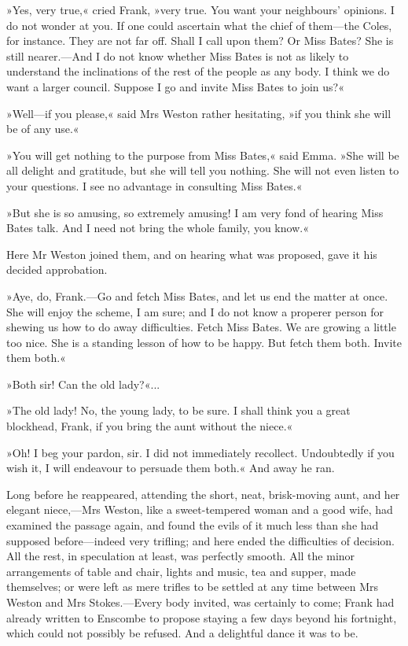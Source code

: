 »Yes, very true,« cried Frank, »very true. You want your neighbours' opinions. I do not wonder at you. If one could ascertain what the chief of them—the Coles, for instance. They are not far off. Shall I call upon them? Or Miss Bates? She is still nearer.—And I do not know whether Miss Bates is not as likely to understand the inclinations of the rest of the people as any body. I think we do want a larger council. Suppose I go and invite Miss Bates to join us?«

»Well—if you please,« said Mrs Weston rather hesitating, »if you think she will be of any use.«

»You will get nothing to the purpose from Miss Bates,« said Emma. »She will be all delight and gratitude, but she will tell you nothing. She will not even listen to your questions. I see no advantage in consulting Miss Bates.«

»But she is so amusing, so extremely amusing! I am very fond of hearing Miss Bates talk. And I need not bring the whole family, you know.«

Here Mr Weston joined them, and on hearing what was proposed, gave it his decided approbation.

»Aye, do, Frank.—Go and fetch Miss Bates, and let us end the matter at once. She will enjoy the scheme, I am sure; and I do not know a properer person for shewing us how to do away difficulties. Fetch Miss Bates. We are growing a little too nice. She is a standing lesson of how to be happy. But fetch them both. Invite them both.«

»Both sir! Can the old lady?«...

»The old lady! No, the young lady, to be sure. I shall think you a great blockhead, Frank, if you bring the aunt without the niece.«

»Oh! I beg your pardon, sir. I did not immediately recollect. Undoubtedly if you wish it, I will endeavour to persuade them both.« And away he ran.

Long before he reappeared, attending the short, neat, brisk-moving aunt, and her elegant niece,—Mrs Weston, like a sweet-tempered woman and a good wife, had examined the passage again, and found the evils of it much less than she had supposed before—indeed very trifling; and here ended the difficulties of decision. All the rest, in speculation at least, was perfectly smooth. All the minor arrangements of table and chair, lights and music, tea and supper, made themselves; or were left as mere trifles to be settled at any time between Mrs Weston and Mrs Stokes.—Every body invited, was certainly to come; Frank had already written to Enscombe to propose staying a few days beyond his fortnight, which could not possibly be refused. And a delightful dance it was to be.

